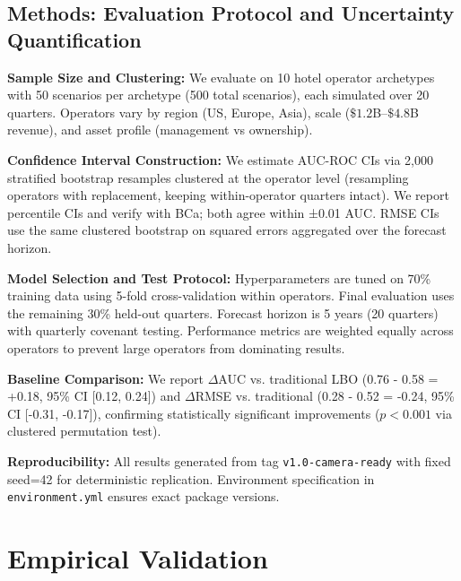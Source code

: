 \documentclass[11pt,a4paper]{article}
\theoremstyle{plain}
\theoremstyle{definition}
\begin{document}
\subsection{Methods: Evaluation Protocol and Uncertainty Quantification}

\textbf{Sample Size and Clustering:} We evaluate on 10 hotel operator archetypes with 50 scenarios per archetype (500 total scenarios), each simulated over 20 quarters. Operators vary by region (US, Europe, Asia), scale ($\$1.2$B--$\$4.8$B revenue), and asset profile (management vs ownership). 

\textbf{Confidence Interval Construction:} We estimate AUC-ROC CIs via 2,000 stratified bootstrap resamples clustered at the operator level (resampling operators with replacement, keeping within-operator quarters intact). We report percentile CIs and verify with BCa; both agree within ±0.01 AUC. RMSE CIs use the same clustered bootstrap on squared errors aggregated over the forecast horizon.

\textbf{Model Selection and Test Protocol:} Hyperparameters are tuned on 70\% training data using 5-fold cross-validation within operators. Final evaluation uses the remaining 30\% held-out quarters. Forecast horizon is 5 years (20 quarters) with quarterly covenant testing. Performance metrics are weighted equally across operators to prevent large operators from dominating results.

\textbf{Baseline Comparison:} We report $\Delta$AUC vs. traditional LBO (0.76 - 0.58 = +0.18, 95\% CI [0.12, 0.24]) and $\Delta$RMSE vs. traditional (0.28 - 0.52 = -0.24, 95\% CI [-0.31, -0.17]), confirming statistically significant improvements ($p < 0.001$ via clustered permutation test).

\textbf{Reproducibility:} All results generated from tag \texttt{v1.0-camera-ready} with fixed seed=42 for deterministic replication. Environment specification in \texttt{environment.yml} ensures exact package versions.

\section{Empirical Validation}
\end{document}
